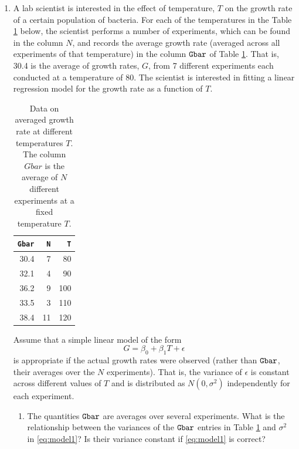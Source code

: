\documentclass{article}
\begin{document}
\begin{enumerate}
\newpage


\item A lab scientist is interested in the effect of temperature, $T$ on 
the growth rate of a certain population of bacteria. 
For each of the temperatures in the Table \ref{table1} below, the scientist performs 
a number of experiments, which can be found in the column $N$, and
records the average growth rate (averaged across all experiments of that temperature) in the column ${\tt Gbar}$  of Table \ref{table1}. That is, 30.4 is the average
of growth rates, $G$, from 7 different experiments each conducted
at a temperature of 80.
The scientist is interested in fitting a linear regression model
for the growth rate as a function of $T$.

\begin{table}
  \centering
\begin{tabular}{rrr}
        {\tt Gbar} &   {\tt N} &    {\tt T} \\ \hline
   30.4 &   7 &   80 \\
   32.1 &   4 &   90 \\
   36.2 &   9 &  100 \\
   33.5 &   3 &  110 \\
   38.4 &  11 &  120 \\
\end{tabular}
\caption{Data on averaged growth rate at different temperatures $T$. The
column $Gbar$ is the average of $N$ different experiments at a fixed temperature
$T$.}
\label{table1}
\end{table}


Assume that a simple linear model of the form
\begin{equation}
  \label{eq:model1}
G = \beta_0 + \beta_1 T + \epsilon  
\end{equation}
is appropriate if the actual growth rates were observed (rather
than ${\tt Gbar}$, their averages over the $N$ experiments). That is,
the variance of $\epsilon$ is constant across different values of $T$
and is distributed as $N(0,\sigma^2)$ independently for each experiment.

\begin{enumerate}

\item The quantities ${\tt Gbar}$ are averages over several experiments. 
What is the relationship between the variances  of the ${\tt Gbar}$ entries in Table \ref{table1} and $\sigma^2$ in \eqref{eq:model1}? Is their variance constant
if \eqref{eq:model1} is correct?


\end{enumerate}
\end{enumerate}
\end{document}
